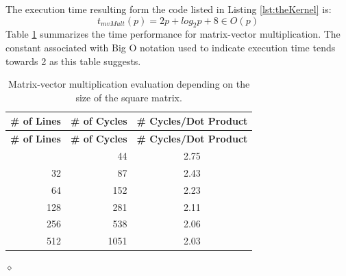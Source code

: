 \begin{exemplu}
The execution time resulting form the code listed in Listing \ref{lst:theKernel} is:
$$t_{mvMult}(p) = 2p + log_2 p + 8 \in O(p)$$
Table \ref{tab:mvPerformance} summarizes the time performance for matrix-vector multiplication. The constant associated with Big O notation used to indicate execution time tends towards 2 as this table suggests.
{\small
{\centering
\begin{longtable}{|r|r|c|}
\caption{Matrix-vector multiplication evaluation depending on the size of the square matrix.}
\label{tab:mvPerformance} \\
\hline
\textbf{\# of Lines} & \textbf{\# of Cycles} & \textbf{\# Cycles/Dot Product} \\
\hline
\endfirsthead
\hline
\textbf{\# of Lines} & \textbf{\# of Cycles} & \textbf{\# Cycles/Dot Product} \\
\hline
\endhead
\hline
\endfoot
\hline
\endlastfoot
16  & 44     & 2.75 \\ \hline
32  & 87    & 2.43 \\ \hline
64  & 152    & 2.23 \\ \hline
128 & 281   & 2.11 \\ \hline
256 & 538  & 2.06 \\ \hline
512 & 1051  & 2.03 \\ \hline
\end{longtable}
}}

$\diamond$
\end{exemplu}

